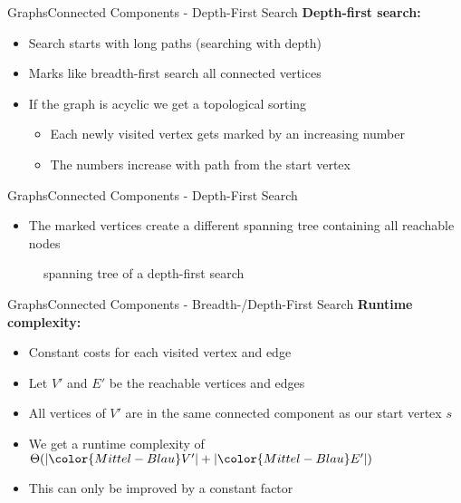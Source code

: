 \begin{frame}{Graphs}{Connected Components - Depth-First Search}
  \textbf{Depth-first search:}
  \begin{itemize}
    \item
      Search starts with {\color{Mittel-Blau}long paths} (searching with depth)
    \item
      Marks like {\color{Mittel-Blau}breadth-first search} all connected
      vertices
    \item
      If the graph is acyclic we get a {\color{Mittel-Blau}topological sorting}
      \begin{itemize}
        \item
          Each newly visited vertex gets marked by an increasing number
        \item
          The numbers increase with path from the start vertex
      \end{itemize}
  \end{itemize}
\end{frame}


\begin{frame}{Graphs}{Connected Components - Depth-First Search}
  \begin{itemize}
    \item
      The marked vertices create a different spanning tree containing all
      reachable nodes
  \end{itemize}
  \begin{figure}
    \begin{adjustbox}{width=0.95\linewidth}
      
    \end{adjustbox}
    \caption{spanning tree of a depth-first search}
    \label{fig:graph:depth_first_search_spanning_tree}
  \end{figure}
\end{frame}


\begin{frame}{Graphs}{Connected Components - Breadth-/Depth-First Search}
  \textbf{Runtime complexity:}
  \begin{itemize}
    \item
      Constant costs for each visited vertex and edge
    \item
      Let {\color{Mittel-Blau}$V'$} and {\color{Mittel-Blau}$E'$} be the
      reachable vertices and edges
    \item
      All vertices of {\color{Mittel-Blau}$V'$} are in the same connected
      component as our start vertex {\color{Mittel-Blau}$s$}
    \item
      We get a runtime complexity of
      \begin{math}
        \Theta(\vert {\color{Mittel-Blau}V'} \vert
          + \vert {\color{Mittel-Blau}E'} \vert)
      \end{math}
    \item
      This can only be improved by a constant factor
  \end{itemize}
\end{frame}